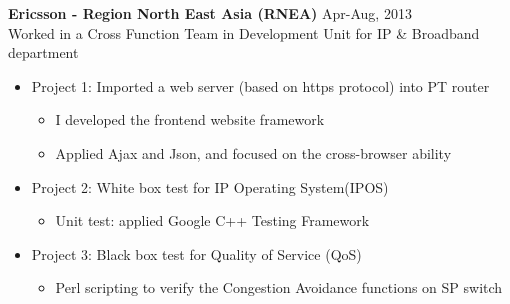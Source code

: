 \documentclass[line,margin]{res}
\begin{document}
\begin{resume}
{\bf Ericsson - Region North East Asia (RNEA)}
\hfill{\textcolor[rgb]{0.7,0.7,0.7}{Apr-Aug, 2013}}\\
Worked in a Cross Function Team in Development Unit for IP \& Broadband department

\begin{itemize}
\itemsep -2pt %

    \item Project 1: Imported a web server (based on https protocol) into PT router\vspace{-6pt}
    \begin{itemize} \itemsep -2pt
        \item I developed the frontend website framework
        \item Applied Ajax and Json, and focused on the cross-browser ability
    \end{itemize}
    
    \item Project 2: White box test for IP Operating System(IPOS)\vspace{-6pt}
    \begin{itemize}\itemsep -2pt %
        \item Unit test: applied Google C++ Testing Framework
    \end{itemize}
    
    \item Project 3: Black box test for Quality of Service (QoS)\vspace{-6pt}
    \begin{itemize}\itemsep -2pt %
        \item Perl scripting to verify the Congestion Avoidance functions on SP switch
    \end{itemize}

\end{itemize}


\end{resume}
\end{document}

